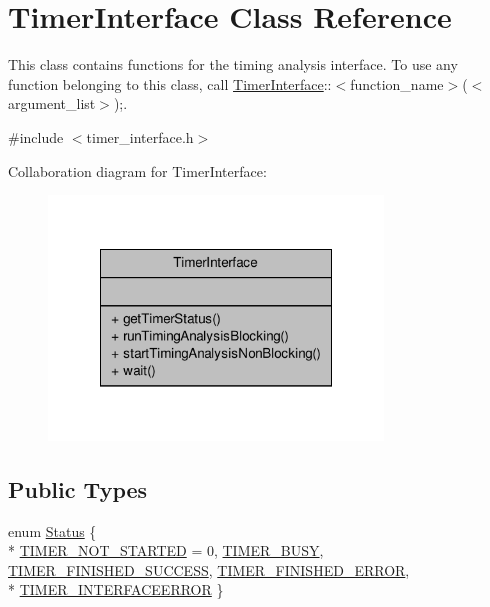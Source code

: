 \hypertarget{classTimerInterface}{\section{Timer\-Interface Class Reference}
\label{classTimerInterface}
}


This class contains functions for the timing analysis interface. To use any function belonging to this class, call \hyperlink{classTimerInterface}{Timer\-Interface}\-:\-:$<$function\-\_\-name$>$($<$argument\-\_\-list$>$);.  




{\ttfamily \#include $<$timer\-\_\-interface.\-h$>$}



Collaboration diagram for Timer\-Interface\-:\nopagebreak
\begin{figure}[H]
\begin{center}
\leavevmode
\includegraphics[width=252pt]{classTimerInterface__coll__graph}
\end{center}
\end{figure}
\subsection*{Public Types}
\begin{DoxyCompactItemize}
\item 
enum \hyperlink{classTimerInterface_afc6cca620922cd5a3d90ea9ad7d7d25d}{Status} \{ \\*
\hyperlink{classTimerInterface_afc6cca620922cd5a3d90ea9ad7d7d25da465cc75852c1feab52c2236ed80ef6da}{T\-I\-M\-E\-R\-\_\-\-N\-O\-T\-\_\-\-S\-T\-A\-R\-T\-E\-D} = 0, 
\hyperlink{classTimerInterface_afc6cca620922cd5a3d90ea9ad7d7d25dac7ae064c5a418037be5e05d69a27f34f}{T\-I\-M\-E\-R\-\_\-\-B\-U\-S\-Y}, 
\hyperlink{classTimerInterface_afc6cca620922cd5a3d90ea9ad7d7d25da134d1131be13795c3f8248c82fa52b9e}{T\-I\-M\-E\-R\-\_\-\-F\-I\-N\-I\-S\-H\-E\-D\-\_\-\-S\-U\-C\-C\-E\-S\-S}, 
\hyperlink{classTimerInterface_afc6cca620922cd5a3d90ea9ad7d7d25da5cbb1b932558e1136faa93a49acc0252}{T\-I\-M\-E\-R\-\_\-\-F\-I\-N\-I\-S\-H\-E\-D\-\_\-\-E\-R\-R\-O\-R}, 
\\*
\hyperlink{classTimerInterface_afc6cca620922cd5a3d90ea9ad7d7d25daf5aa3834e4e74e57e8264fdb3b7eb757}{T\-I\-M\-E\-R\-\_\-\-I\-N\-T\-E\-R\-F\-A\-C\-E\-E\-R\-R\-O\-R}
 \}
\end{DoxyCompactItemize}
